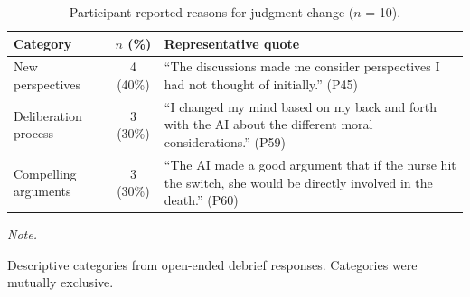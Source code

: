 \begin{table}[h]
\centering
\caption{\label{tab:reasons_change}Participant-reported reasons for judgment change ($n$ = 10).}
\fontsize{10}{12}\selectfont
\begin{threeparttable}
\begin{tabular}[t]{lcp{7.5cm}}
\toprule
Category & $n$ (\%) & Representative quote\\
\midrule
New perspectives & 4 (40\%) & ``The discussions made me consider perspectives I had not thought of initially.'' (P45)\\
\addlinespace[0.3em]
Deliberation process & 3 (30\%) & ``I changed my mind based on my back and forth with the AI about the different moral considerations.'' (P59)\\
\addlinespace[0.3em]
Compelling arguments & 3 (30\%) & ``The AI made a good argument that if the nurse hit the switch, she would be directly involved in the death.'' (P60)\\
\bottomrule
\end{tabular}
\begin{tablenotes}
\item \textit{Note.}
\item Descriptive categories from open-ended debrief responses. Categories were mutually exclusive.
\end{tablenotes}
\end{threeparttable}
\end{table}
